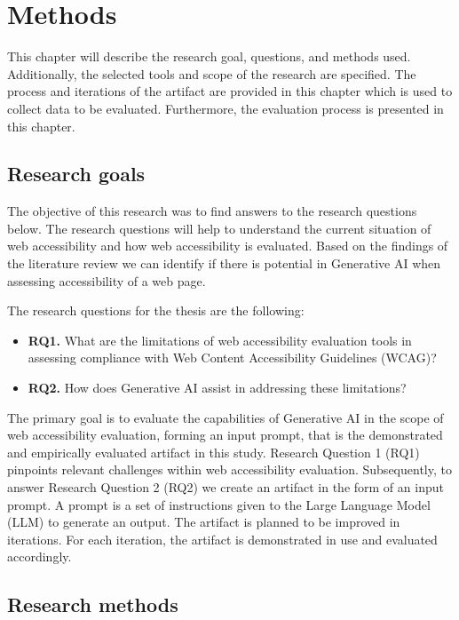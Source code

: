 \chapter{Methods\label{methods}}

This chapter will describe the research goal, questions, and methods used. Additionally, the selected tools and scope of the research are specified. The process and iterations of the artifact are provided in this chapter which is used to collect data to be evaluated. Furthermore, the evaluation process is presented in this chapter.

\section{Research goals}

The objective of this research was to find answers to the research questions below. The research questions will help to understand the current situation of web accessibility and how web accessibility is evaluated. Based on the findings of the literature review we can identify if there is potential in Generative AI when assessing accessibility of a web page. 

The research questions for the thesis are the following:

\begin{itemize}
    \item \textbf{RQ1.} What are the limitations of web accessibility evaluation tools in assessing compliance with Web Content Accessibility Guidelines (WCAG)?
    \item \textbf{RQ2.} How does Generative AI assist in addressing these limitations?
\end{itemize}

The primary goal is to evaluate the capabilities of Generative AI in the scope of web accessibility evaluation, forming an input prompt, that is the demonstrated and empirically evaluated artifact in this study. Research Question 1 (RQ1) pinpoints relevant challenges within web accessibility evaluation. Subsequently, to answer Research Question 2 (RQ2) we create an artifact in the form of an input prompt. A prompt is a set of instructions given to the Large Language Model (LLM) to generate an output. The artifact is planned to be improved in iterations. For each iteration, the artifact is demonstrated in use and evaluated accordingly.

\section{Research methods}

